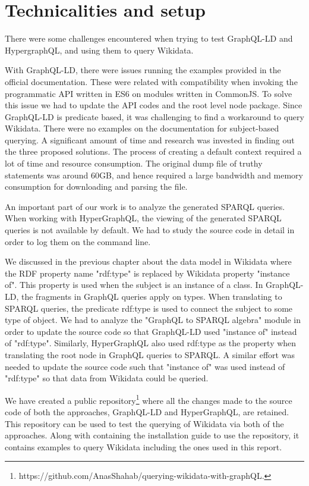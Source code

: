\section{Technicalities and setup}
There were some challenges encountered when trying to test GraphQL-LD and HypergraphQL, and using them to query Wikidata. 

With GraphQL-LD, there were issues running the examples provided in the official documentation. These were related with compatibility when invoking the programmatic API written in ES6 on modules written in CommonJS. To solve this issue we had to update the API codes and the root level node package. Since GraphQL-LD is predicate based, it was challenging to find a workaround to query Wikidata. There were no examples on the documentation for subject-based querying. A significant amount of time and research was invested in finding out the three proposed solutions. The process of creating a default context required a lot of time and resource consumption. The original dump file of truthy statements was around 60GB, and hence required a large bandwidth and memory consumption for downloading and parsing the file. 

An important part of our work is to analyze the generated SPARQL queries. When working with HyperGraphQL, the viewing of the generated SPARQL queries is not available by default. We had to study the source code in detail in order to log them on the command line. 

We discussed in the previous chapter about the data model in Wikidata where the RDF property name "rdf:type" is replaced by Wikidata property "instance of". This property is used when the subject is an instance of a class. In GraphQL-LD, the fragments in GraphQL queries apply on types. When translating to SPARQL queries, the predicate rdf:type is used to connect the subject to some type of object. We had to analyze the "GraphQL to SPARQL algebra" module in order to update the source code so that GraphQL-LD used "instance of" instead of "rdf:type". Similarly, HyperGraphQL also used rdf:type as the property when translating the root node in GraphQL queries to SPARQL. A similar effort was needed to update the source code such that "instance of" was used instead of "rdf:type" so that data from Wikidata could be queried.

We have created a public repository\footnote{https://github.com/AnasShahab/querying-wikidata-with-graphQL.} where all the changes made to the source code of both the approaches, GraphQL-LD and HyperGraphQL, are retained. This repository can be used to test the querying of Wikidata via both of the approaches. Along with containing the installation guide to use the repository, it contains examples to query Wikidata including the ones used in this report.